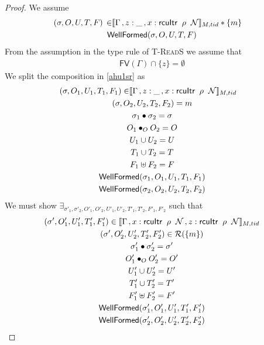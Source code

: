  \begin{proof}
We assume
\begin{gather}\label{ahu1sr}
  \begin{aligned}
    (\sigma, O, U, T,F) \, \in &  \llbracket \Gamma\,, z:\_ \, ,\rcuitrT{x}{G}{k}{k+1}{\_} \rrbracket_{M,tid} * \{m\}
    \end{aligned} \\
\textsf{WellFormed}(\sigma,O,U,T,F)
\label{ahu2sr}
\end{gather}
From the assumption in the type rule of \textsc{T-ReadS} we assume that
\begin{gather}
\textsf{FV}(\Gamma) \cap \{z\}  =\emptyset 
  \label{ahu3sr}
\end{gather}
We split the composition in  \ref{ahu1sr} as 
\begin{gather} \label{ahu11sr}
  \begin{aligned}
    (\sigma, O_{1}, U_{1}, T_{1} ,F_1) \in & \llbracket  \Gamma\,, z:\_ \, ,\rcuitrT{x}{G}{k}{k+1}{\_} \rrbracket_{M,tid} \end{aligned}\\
\label{ahu12sr}
(\sigma, O_{2}, U_{2}, T_{2}, F_2) = m
\\
\label{ahusigsr}
\sigma_1 \bullet \sigma_2 = \sigma
\\
\label{ahu13sr}
O_{1} \bullet_{O} O_{2} = O
\\
\label{ahu14sr}
U_{1} \cup U_{2} = U
\\
\label{ahu15sr}
T_{1} \cup T_{2} = T
\\
\label{ahusrf}
F_1 \uplus F_2 = F
\\
\label{ahu16sr}
\textsf{WellFormed}(\sigma_1,O_{1},U_{1},T_{1},F_1)
\\
\label{ahu17sr}
\textsf{WellFormed}(\sigma_2,O_{2},U_{2},T_{2},F_2)
\end{gather}
We must show $\exists_{\sigma'_1, \sigma'_2, O'_{1}, O'_{2}, U'_{1}, U'_{2}, T'_{1}, T'_{2}, F'_1 , F'_2}$ such that
\begin{gather}\label{phu5sr}
\begin{aligned}
(\sigma',O'_{1},U'_{1}, T'_{1}, F'_1)  \in \llbracket \Gamma\,, \rcuitrT{x}{G}{k}{k+1}{\_}\, , \rcuitrT{z}{G}{k}{k+1}{\_}  \rrbracket_{M,tid}
\end{aligned}\\
\label{phu6sr}
(\sigma',O'_{2},U'_{2}, T'_{2}, F'_2) \in \mathcal{R}(\{m\})
\\
\label{ahusigsr'}
\sigma'_1 \bullet \sigma'_2 = \sigma'
\\
\label{phu7sr}
O'_{1} \bullet_{O} O'_{2} = O'
\\
\label{phu8sr}
U'_{1} \cup U'_{2} = U'
\\
\label{phu9sr}
T'_{1} \cup T'_{2} = T'
\\
\label{phusrf}
F'_1 \uplus F'_2 = F'
\\
\label{phu10sr}
\textsf{WellFormed}(\sigma_1',O'_{1},U'_{1},T'_{1},F'_1) \\
\label{phu11sr}
\textsf{WellFormed}(\sigma_2',O'_{2},U'_{2},T'_{2}, F'_2)
\end{gather}


\end{proof}
